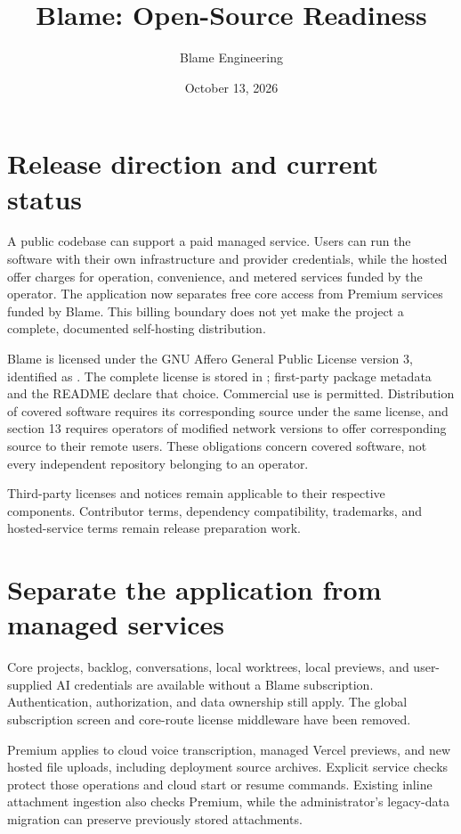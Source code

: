 \documentclass[11pt,a4paper]{article}
\title{Blame: Open-Source Readiness}
\author{Blame Engineering}
\date{October 13, 2026}
\newcommand{\code}[1]{\texttt{\detokenize{#1}}}
\begin{document}
\maketitle

\section{Release direction and current status}
A public codebase can support a paid managed service. Users can run the software
with their own infrastructure and provider credentials, while the hosted offer
charges for operation, convenience, and metered services funded by the operator.
The application now separates free core access from Premium services funded by
Blame. This billing boundary does not yet make the project a complete,
documented self-hosting distribution.

Blame is licensed under the GNU Affero General Public License version 3,
identified as \code{AGPL-3.0-only}. The complete license is stored in
\code{LICENSE}; first-party package metadata and the README declare that choice.
Commercial use is permitted. Distribution of covered software requires its
corresponding source under the same license, and section 13 requires operators
of modified network versions to offer corresponding source to their remote
users. These obligations concern covered software, not every independent
repository belonging to an operator.

Third-party licenses and notices remain applicable to their respective
components. Contributor terms, dependency compatibility, trademarks, and
hosted-service terms remain release preparation work.

\section{Separate the application from managed services}
Core projects, backlog, conversations, local worktrees, local previews, and
user-supplied AI credentials are available without a Blame subscription.
Authentication, authorization, and data ownership still apply. The global
subscription screen and core-route license middleware have been removed.

Premium applies to cloud voice transcription, managed Vercel previews, and new
hosted file uploads, including deployment source archives. Explicit service
checks protect those operations and cloud start or resume commands. Existing
inline attachment ingestion also checks Premium, while the administrator's
legacy-data migration can preserve previously stored attachments.
\end{document}
